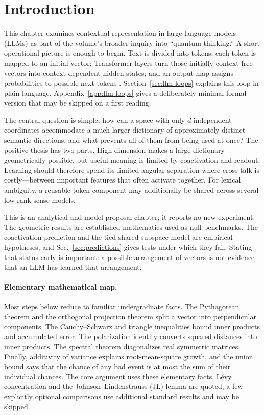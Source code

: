 \documentclass[
  aps,
  reprint,
  superscriptaddress,
  floatfix,
  nofootinbib,
  longbibliography
]{revtex4-2}
\begin{document}
\section{Introduction}
\label{sec:intro}

This chapter examines contextual representation in large language models
(LLMs) as part of the volume's broader inquiry into ``quantum thinking.''  A
short operational picture is enough to begin.  Text is divided into tokens;
each token is mapped to an initial vector; Transformer layers turn those
initially context-free vectors into context-dependent hidden states; and an
output map assigns probabilities to possible next tokens
\cite{Vaswani-2017-Attention}.  Section~\ref{sec:llm-loops} explains this loop
in plain language.  Appendix~\ref{app:llm-loops} gives a deliberately minimal
formal version that may be skipped on a first reading.

The central question is simple: how can a space with only $d$ independent
coordinates accommodate a much larger dictionary of approximately distinct
semantic directions, and what prevents all of them from being used at once?
The positive thesis has two parts.  High dimension makes a large dictionary
geometrically possible, but useful meaning is limited by coactivation and
readout.  Learning should therefore spend its limited angular separation where
cross-talk is costly---between important features that often activate
together.  For lexical ambiguity, a reusable token component may additionally
be shared across several low-rank sense models.

This is an analytical and model-proposal chapter; it reports no new experiment.
The geometric results are established mathematics used as null benchmarks.
The coactivation prediction and the tied shared-subspace model are empirical
hypotheses, and Sec.~\ref{sec:predictions} gives tests under which they fail.
Stating that status early is important: a possible arrangement of vectors is
not evidence that an LLM has learned that arrangement.

\paragraph{Elementary mathematical map.}
Most steps below reduce to familiar undergraduate facts.  The Pythagorean
theorem and the orthogonal projection theorem split a vector into perpendicular
components.  The Cauchy--Schwarz and triangle inequalities bound inner products
and accumulated error.  The polarization identity converts squared distances
into inner products.  The spectral theorem diagonalizes real symmetric
matrices.  Finally, additivity of variance explains root-mean-square growth,
and the union bound says that the chance of any bad event is at most the sum of
their individual chances.  The core argument uses these elementary facts.
L\'evy concentration and the Johnson--Lindenstrauss (JL) lemma are quoted;
a few explicitly optional comparisons use additional standard results and may
be skipped.
\end{document}
